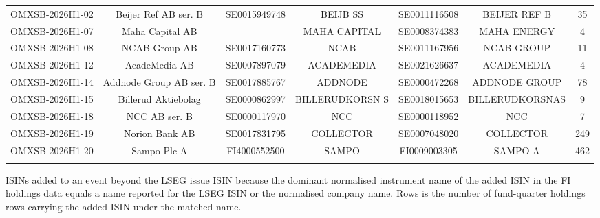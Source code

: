 \begin{threeparttable}
\begin{tabular}{@{}lcccccc}
\addlinespace[0.25ex]
\addlinespace[0.25ex]
OMXSB-2026H1-02 & Beijer Ref AB ser. B & SE0015949748 & BEIJB SS & SE0011116508 & BEIJER REF B & 35 \\
\addlinespace[0.25ex]
\addlinespace[0.25ex]
OMXSB-2026H1-07 & Maha Capital AB &  & MAHA CAPITAL & SE0008374383 & MAHA ENERGY & 4 \\
\addlinespace[0.25ex]
\addlinespace[0.25ex]
OMXSB-2026H1-08 & NCAB Group AB & SE0017160773 & NCAB & SE0011167956 & NCAB GROUP & 11 \\
\addlinespace[0.25ex]
\addlinespace[0.25ex]
OMXSB-2026H1-12 & AcadeMedia AB & SE0007897079 & ACADEMEDIA & SE0021626637 & ACADEMEDIA & 4 \\
\addlinespace[0.25ex]
\addlinespace[0.25ex]
OMXSB-2026H1-14 & Addnode Group AB ser. B & SE0017885767 & ADDNODE & SE0000472268 & ADDNODE GROUP & 78 \\
\addlinespace[0.25ex]
\addlinespace[0.25ex]
OMXSB-2026H1-15 & Billerud Aktiebolag & SE0000862997 & BILLERUDKORSN S & SE0018015653 & BILLERUDKORSNAS & 9 \\
\addlinespace[0.25ex]
\addlinespace[0.25ex]
OMXSB-2026H1-18 & NCC AB ser. B & SE0000117970 & NCC & SE0000118952 & NCC & 7 \\
\addlinespace[0.25ex]
\addlinespace[0.25ex]
OMXSB-2026H1-19 & Norion Bank AB & SE0017831795 & COLLECTOR & SE0007048020 & COLLECTOR & 249 \\
\addlinespace[0.25ex]
\addlinespace[0.25ex]
OMXSB-2026H1-20 & Sampo Plc A & FI4000552500 & SAMPO & FI0009003305 & SAMPO A & 462 \\
\addlinespace[0.25ex]
\bottomrule
\end{tabular}
\endgroup
\noindent\begin{minipage}{\linewidth}\smallskip\footnotesize
ISINs added to an event beyond the LSEG issue ISIN because the dominant normalised instrument name of the added ISIN in the FI holdings data equals a name reported for the LSEG ISIN or the normalised company name. Rows is the number of fund-quarter holdings rows carrying the added ISIN under the matched name.\end{minipage}

\end{threeparttable}